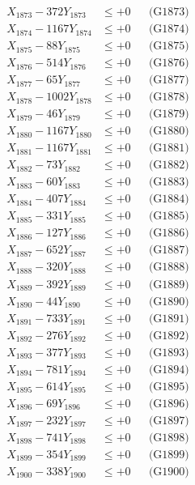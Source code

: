 \documentclass[a4paper,10pt]{article}
\begin{document}
{\begin{align}
X_{1873} - 372Y_{1873} &\leq +0 && \text{(G1873)} \\
X_{1874} - 1167Y_{1874} &\leq +0 && \text{(G1874)} \\
X_{1875} - 88Y_{1875} &\leq +0 && \text{(G1875)} \\
X_{1876} - 514Y_{1876} &\leq +0 && \text{(G1876)} \\
X_{1877} - 65Y_{1877} &\leq +0 && \text{(G1877)} \\
X_{1878} - 1002Y_{1878} &\leq +0 && \text{(G1878)} \\
X_{1879} - 46Y_{1879} &\leq +0 && \text{(G1879)} \\
X_{1880} - 1167Y_{1880} &\leq +0 && \text{(G1880)} \\
\allowbreak
X_{1881} - 1167Y_{1881} &\leq +0 && \text{(G1881)} \\
X_{1882} - 73Y_{1882} &\leq +0 && \text{(G1882)} \\
X_{1883} - 60Y_{1883} &\leq +0 && \text{(G1883)} \\
X_{1884} - 407Y_{1884} &\leq +0 && \text{(G1884)} \\
X_{1885} - 331Y_{1885} &\leq +0 && \text{(G1885)} \\
X_{1886} - 127Y_{1886} &\leq +0 && \text{(G1886)} \\
X_{1887} - 652Y_{1887} &\leq +0 && \text{(G1887)} \\
X_{1888} - 320Y_{1888} &\leq +0 && \text{(G1888)} \\
X_{1889} - 392Y_{1889} &\leq +0 && \text{(G1889)} \\
X_{1890} - 44Y_{1890} &\leq +0 && \text{(G1890)} \\
\allowbreak
X_{1891} - 733Y_{1891} &\leq +0 && \text{(G1891)} \\
X_{1892} - 276Y_{1892} &\leq +0 && \text{(G1892)} \\
X_{1893} - 377Y_{1893} &\leq +0 && \text{(G1893)} \\
X_{1894} - 781Y_{1894} &\leq +0 && \text{(G1894)} \\
X_{1895} - 614Y_{1895} &\leq +0 && \text{(G1895)} \\
X_{1896} - 69Y_{1896} &\leq +0 && \text{(G1896)} \\
X_{1897} - 232Y_{1897} &\leq +0 && \text{(G1897)} \\
X_{1898} - 741Y_{1898} &\leq +0 && \text{(G1898)} \\
X_{1899} - 354Y_{1899} &\leq +0 && \text{(G1899)} \\
X_{1900} - 338Y_{1900} &\leq +0 && \text{(G1900)} \\

\end{align}}
\end{document}
